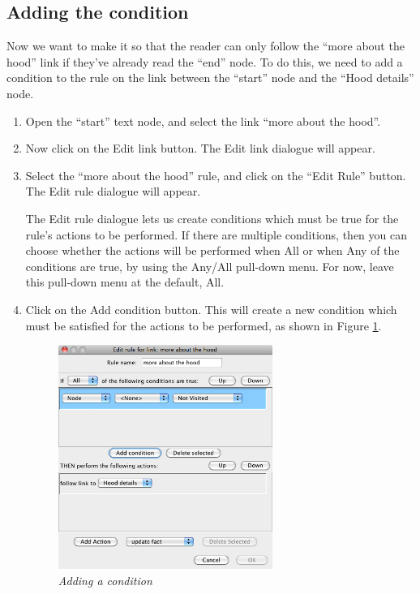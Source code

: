 \documentclass{article}
\begin{document}
\subsection{Adding the condition}

Now we want to make it so that the reader can only follow the ``more about the
hood'' link if they've already read the ``end'' node. To do this, we need to
add a condition to the rule on the link between the ``start'' node and the
``Hood details'' node.

\begin{enumerate}
  \item Open the ``start'' text node, and select the link ``more about the
  hood''.
  \item Now click on the Edit link button. The Edit link dialogue will appear.
  \item Select the ``more about the hood'' rule, and click on the ``Edit Rule''
  button. The Edit rule dialogue will appear.

The Edit rule dialogue lets us create conditions which must be true for the
rule's actions to be performed. If there are multiple conditions, then you can
choose whether the actions will be performed when All or when Any of the
conditions are true, by using the Any/All pull-down menu. For now, leave this
pull-down menu at the default, All.

\item Click on the Add condition button. This will create a new condition which
must be satisfied for the actions to be performed, as shown in Figure
\ref{fig:adding_condition}.
 
\begin{figure}[ht]
  \centering
  \includegraphics[width=7cm]{images/hypedyn-tutorial-1-figure-13}
  \caption{\textit{Adding a condition}}
  \label{fig:adding_condition}
\end{figure} 


\end{enumerate}
\end{document}
